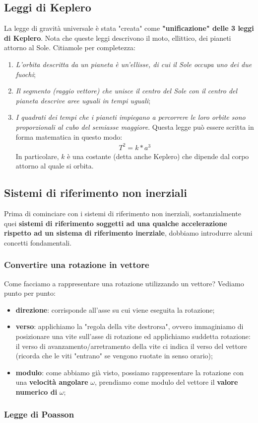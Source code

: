         \subsection{Leggi di Keplero}
            La legge di gravità universale è stata "creata" come \textbf{"unificazione" delle 3 leggi di Keplero}. Nota che queste leggi descrivono il moto, ellittico, dei pianeti attorno al Sole. Citiamole per completezza:
            \begin{enumerate}
                \item \textit{L'orbita descritta da un pianeta è un'ellisse, di cui il Sole occupa uno dei due fuochi};
                \item \textit{Il segmento (raggio vettore) che unisce il centro del Sole con il centro del pianeta descrive aree uguali in tempi uguali};
                \item \textit{I quadrati dei tempi che i pianeti impiegano a percorrere le loro orbite sono proporzionali al cubo del semiasse maggiore}. Questa legge può essere scritta in forma matematica in questo modo:
                \begin{align*}
                    T^2=k*a^3
                \end{align*}
                In particolare, $k$ è una costante (detta anche Keplero) che dipende dal corpo attorno al quale si orbita.
            \end{enumerate}

    \subsection{Sistemi di riferimento non inerziali}
        Prima di cominciare con i sistemi di riferimento non inerziali, sostanzialmente quei \textbf{sistemi di riferimento soggetti ad una qualche accelerazione rispetto ad un sistema di riferimento inerziale}, dobbiamo introdurre alcuni concetti fondamentali.
        \subsubsection{Convertire una rotazione in vettore}
            Come facciamo a rappresentare una rotazione utilizzando un vettore? Vediamo punto per punto:
            \begin{itemize}
                \item \textbf{direzione}: corrisponde all'asse su cui viene eseguita la rotazione;
                \item \textbf{verso}: applichiamo la "regola della vite destrorsa", ovvero immaginiamo di posizionare una vite sull'asse di rotazione ed applichiamo suddetta rotazione: il verso di avanzamento/arretramento della vite ci indica il verso del vettore (ricorda che le viti "entrano" se vengono ruotate in senso orario);
                \item \textbf{modulo}: come abbiamo già visto, possiamo rappresentare la rotazione con una \textbf{velocità angolare} $\omega$, prendiamo come modulo del vettore il \textbf{valore numerico di }$\omega$; 
            \end{itemize}
        \subsubsection{Legge di Poasson}
